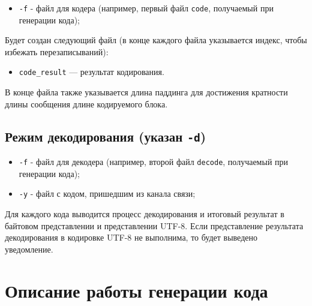 \documentclass{article}
\begin{document}
\begin{itemize}
\item \texttt{-f} - файл для кодера (например, первый файл \texttt{code}, получаемый при генерации кода);
\end{itemize}

Будет создан следующий файл (в конце каждого файла указывается индекс, чтобы избежать перезаписываний):
\begin{itemize}
\item \texttt{code\_result} --- результат кодирования.
\end{itemize}

В конце файла также указывается длина паддинга для достижения кратности длины сообщения длине кодируемого блока.

\subsection{Режим декодирования (указан \texttt{-d})}

\begin{itemize}
\item \texttt{-f} - файл для декодера (например, второй файл \texttt{decode}, получаемый при генерации кода);
\item \texttt{-y} - файл с  кодом, пришедшим из канала связи;
\end{itemize}

Для каждого кода выводится процесс декодирования и итоговый результат в байтовом представлении и представлении UTF-8.
Если представление результата декодирования в кодировке UTF-8 не выполнима, то будет выведено уведомление.

\section{Описание работы генерации кода}
\end{document}
